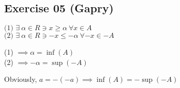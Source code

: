 \subsection*{Exercise 05 (Gapry)}
\begin{flushleft}
$\text{(1) } \exists\ \alpha \in R \ni  x \geq  \alpha \ \forall  x \in  A$ \\
$\text{(2) } \exists\ \alpha \in R \ni -x \leq -\alpha \ \forall -x \in -A$ \\
\end{flushleft}

\begin{flushleft}
(1) $\implies  \alpha = \inf( A)$ \\
(2) $\implies -\alpha = \sup(-A)$
\end{flushleft}

\begin{flushleft}
Obviously, $a = -(-a) \implies \inf(A) = -\sup(-A)$
\end{flushleft}

